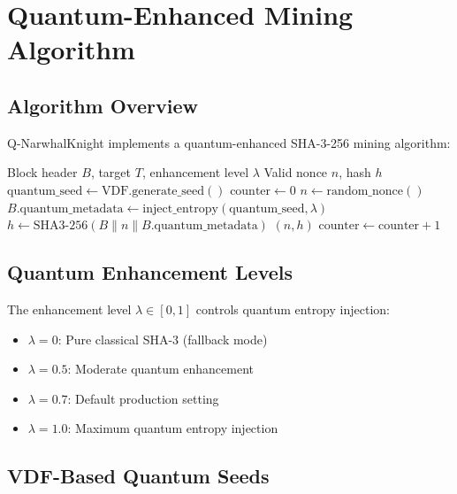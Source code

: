 \documentclass[11pt,a4paper]{article}
\begin{document}
\section{Quantum-Enhanced Mining Algorithm}

\subsection{Algorithm Overview}

Q-NarwhalKnight implements a quantum-enhanced SHA-3-256 mining algorithm:

\begin{algorithm}
\caption{Quantum-Enhanced Mining}
\begin{algorithmic}[1]
\Require Block header $B$, target $T$, enhancement level $\lambda$
\Ensure Valid nonce $n$, hash $h$
\State $\text{quantum\_seed} \gets \text{VDF.generate\_seed}()$
\State $\text{counter} \gets 0$
    \State $n \gets \text{random\_nonce}()$
        \State $B.\text{quantum\_metadata} \gets \text{inject\_entropy}(\text{quantum\_seed}, \lambda)$
    \EndIf
    \State $h \gets \text{SHA3-256}(B \| n \| B.\text{quantum\_metadata})$
        \Return $(n, h)$
    \EndIf
    \State $\text{counter} \gets \text{counter} + 1$
\EndWhile
\end{algorithmic}
\end{algorithm}

\subsection{Quantum Enhancement Levels}

The enhancement level $\lambda \in [0, 1]$ controls quantum entropy injection:

\begin{itemize}
    \item $\lambda = 0$: Pure classical SHA-3 (fallback mode)
    \item $\lambda = 0.5$: Moderate quantum enhancement
    \item $\lambda = 0.7$: Default production setting
    \item $\lambda = 1.0$: Maximum quantum entropy injection
\end{itemize}

\subsection{VDF-Based Quantum Seeds}
\end{document}
